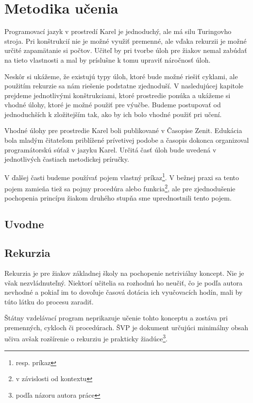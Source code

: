 \chapter{Metodika u\texorpdfstring{č}{c}enia}

Programovací jazyk v prostredí Karel je jednoduchý, ale má silu Turingovho stroja.
Pri konštrukcií nie je možné využiť premenné, ale vďaka rekurzii je možné určité zapamätanie si počtov.
Učiteľ by pri tvorbe úloh pre žiakov nemal zabúdať na tieto vlastnosti a mal by príslušne k tomu upraviť náročnosť úloh.

Neskôr si ukážeme, že existujú typy úloh, ktoré bude možné riešiť cyklami, ale použitím rekurzie sa nám riešenie podstatne zjednoduší.
V nasledujúcej kapitole prejdeme jednotlivými konštrukciami, ktoré prostredie ponúka a ukážeme si vhodné úlohy, ktoré je možné použiť pre výučbe.
Budeme postupovať od jednoduchších k zložitejším tak, ako by ich bolo vhodné použiť pri učení. 

Vhodné úlohy pre prostredie Karel boli publikované v Časopise Zenit\cite{ZENIT}.
Edukácia bola mladým čitateľom priblížené prívetivej podobe a časopis dokonca organizoval programátorskú súťaž v jazyku Karel.
Určitá časť úloh bude uvedená v jednotlivých častiach metodickej príručky.

V ďalšej časti budeme používať pojem vlastný príkaz\footnote{resp. príkaz}.
V bežnej praxi sa tento pojem zamieňa tiež sa pojmy procedúra alebo funkcia\footnote{v závislosti od kontextu}, ale pre zjednodušenie pochopenia princípu žiakom druhého stupňa sme uprednostnili tento pojem.

\section{Uvodne}


\section{Rekurzia}

Rekurzia je pre žiakov základnej školy na pochopenie netriviálny koncept.
Nie je však nezvládnuteľný.
Niektorí učitelia sa rozhodnú ho neučiť, čo je podľa autora nevhodné a pokiaľ im to dovoľuje časová dotácia ich vyučovacích hodín, mali by túto látku do procesu zaradiť.

Štátny vzdelávací program\cite{ISCED2} neprikazuje učenie tohto konceptu a zostáva pri premenných, cykloch či procedúrach.
ŠVP je dokument určujúci minimálny obsah učiva avšak rozšírenie o rekurziu je prakticky žiadúce\footnote{podľa názoru autora práce}.

